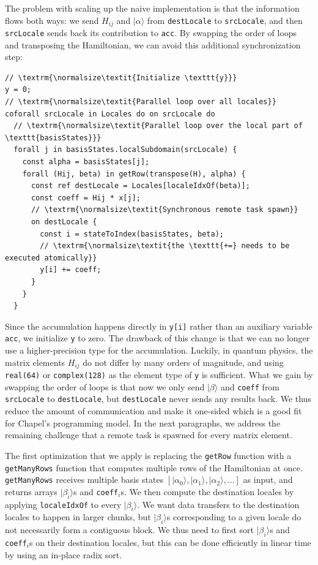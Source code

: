 The problem with scaling up the naive implementation is that the information flows both ways: we send $H_{ij}$ and $|\alpha\rangle$ from \verb|destLocale| to \verb|srcLocale|, and then \verb|srcLocale| sends back its contribution to \verb|acc|. By swapping the order of loops and transposing the Hamiltonian, we can avoid this additional synchronization step:

\begin{verbatim}
// \textrm{\normalsize\textit{Initialize \texttt{y}}}
y = 0;
// \textrm{\normalsize\textit{Parallel loop over all locales}}
coforall srcLocale in Locales do on srcLocale do
  // \textrm{\normalsize\textit{Parallel loop over the local part of \texttt{basisStates}}}
  forall j in basisStates.localSubdomain(srcLocale) {
    const alpha = basisStates[j];
    forall (Hij, beta) in getRow(transpose(H), alpha) {
      const ref destLocale = Locales[localeIdxOf(beta)];
      const coeff = Hij * x[j];
      // \textrm{\normalsize\textit{Synchronous remote task spawn}}
      on destLocale {
        const i = stateToIndex(basisStates, beta);
        // \textrm{\normalsize\textit{the \texttt{+=} needs to be executed atomically}}
        y[i] += coeff;
      }
    }
  }
\end{verbatim}

Since the accumulation happens directly in \verb|y[i]| rather than an auxiliary variable \verb|acc|, we initialize \verb|y| to zero. The drawback of this change is that we can no longer use a higher-precision type for the accumulation. Luckily, in quantum physics, the matrix elements $H_{ij}$ do not differ by many orders of magnitude, and using \verb|real(64)| or \verb|complex(128)| as the element type of \verb|y| is sufficient. What we gain by swapping the order of loops is that now we only send $|\beta\rangle$ and \verb|coeff| from \verb|srcLocale| to \verb|destLocale|, but \verb|destLocale| never sends any results back. We thus reduce the amount of communication and make it one-sided which is a good fit for Chapel's programming model. In the next paragraphs, we address the remaining challenge that a remote task is spawned for every matrix element.

The first optimization that we apply is replacing the \verb|getRow| function with a \verb|getManyRows| function that computes multiple rows of the Hamiltonian at once. \verb|getManyRows| receives multiple basis states $[|\alpha_0\rangle, |\alpha_1\rangle, |\alpha_2\rangle, \dots]$ as input, and returns arrays $|\beta_i\rangle$s and \verb|coeff|$_i$s. We then compute the destination locales by applying \verb|localeIdxOf| to every $|\beta_i\rangle$. We want data transfers to the destination locales to happen in larger chunks, but $|\beta_i\rangle$s corresponding to a given locale do not necessarily form a contiguous block. We thus need to first sort $|\beta_i\rangle$s and \verb|coeff|$_i$s on their destination locales, but this can be done efficiently in linear time by using an in-place radix sort.


